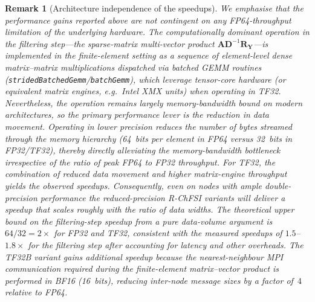 \documentclass[preprint,3p,number,sort&compress]{elsarticle}
\newtheorem{remark}[theorem]{Remark}
\newcommand{\bA}{\textbf{A}}
\newcommand{\bD}{\textbf{D}}
\newcommand{\bY}{\textbf{Y}}
\newcommand{\bR}{\textbf{R}}
\newcommand{\cblue }{\color{black}}
\newcommand{\cn}{\color{black}}
\begin{document}
\begin{remark}[Architecture independence of the speedups]
{\cblue We emphasise that the performance gains reported above are not contingent on any FP64-throughput limitation of the underlying hardware. The computationally dominant operation in the filtering step---the sparse-matrix multi-vector product $\bA\bD^{-1}\bR_{\bY}$---is implemented in the finite-element setting as a sequence of element-level dense matrix--matrix multiplications dispatched via batched GEMM routines (\texttt{stridedBatchedGemm}/\texttt{batchGemm}), which leverage tensor-core hardware (or equivalent matrix engines, e.g.\ Intel XMX units) when operating in TF32. Nevertheless, the operation remains largely memory-bandwidth bound on modern architectures, so the primary performance lever is the reduction in data movement. Operating in lower precision reduces the number of bytes streamed through the memory hierarchy (64~bits per element in FP64 versus 32~bits in FP32/TF32), thereby directly alleviating the memory-bandwidth bottleneck irrespective of the ratio of peak FP64 to FP32 throughput. For TF32, the combination of reduced data movement and higher matrix-engine throughput yields the observed speedups. Consequently, even on nodes with ample double-precision performance the reduced-precision R-ChFSI variants will deliver a speedup that scales roughly with the ratio of data widths. The theoretical upper bound on the filtering-step speedup from a pure data-volume argument is $64/32=2{\times}$ for FP32 and TF32, consistent with the measured speedups of $1.5$--$1.8{\times}$ for the filtering step after accounting for latency and other overheads. The TF32B variant gains additional speedup because the nearest-neighbour MPI communication required during the finite-element matrix--vector product is performed in BF16 (16~bits), reducing inter-node message sizes by a factor of~$4$ relative to FP64.\cn}
\end{remark}
\end{document}
